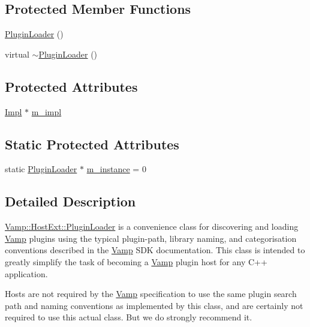 \subsection*{Protected Member Functions}
\begin{DoxyCompactItemize}
\item 
\hyperlink{class_vamp_1_1_host_ext_1_1_plugin_loader_a5ab9e0281244bef7976c6c0ce1a55c24}{Plugin\+Loader} ()
\item 
virtual \hyperlink{class_vamp_1_1_host_ext_1_1_plugin_loader_a9e092d864efdc0f16c032bfb25e76dea}{$\sim$\+Plugin\+Loader} ()
\end{DoxyCompactItemize}
\subsection*{Protected Attributes}
\begin{DoxyCompactItemize}
\item 
\hyperlink{class_vamp_1_1_host_ext_1_1_plugin_loader_1_1_impl}{Impl} $\ast$ \hyperlink{class_vamp_1_1_host_ext_1_1_plugin_loader_ac12254d823f6d63cb8ce82a07bdcb072}{m\+\_\+impl}
\end{DoxyCompactItemize}
\subsection*{Static Protected Attributes}
\begin{DoxyCompactItemize}
\item 
static \hyperlink{class_vamp_1_1_host_ext_1_1_plugin_loader}{Plugin\+Loader} $\ast$ \hyperlink{class_vamp_1_1_host_ext_1_1_plugin_loader_aaa4eae58ddbadf6537a95dbb6e957187}{m\+\_\+instance} = 0
\end{DoxyCompactItemize}


\subsection{Detailed Description}
\hyperlink{class_vamp_1_1_host_ext_1_1_plugin_loader}{Vamp\+::\+Host\+Ext\+::\+Plugin\+Loader} is a convenience class for discovering and loading \hyperlink{namespace_vamp}{Vamp} plugins using the typical plugin-\/path, library naming, and categorisation conventions described in the \hyperlink{namespace_vamp}{Vamp} S\+DK documentation. This class is intended to greatly simplify the task of becoming a \hyperlink{namespace_vamp}{Vamp} plugin host for any C++ application.

Hosts are not required by the \hyperlink{namespace_vamp}{Vamp} specification to use the same plugin search path and naming conventions as implemented by this class, and are certainly not required to use this actual class. But we do strongly recommend it.

